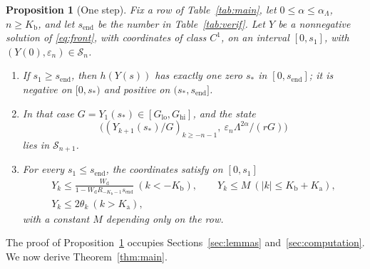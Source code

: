 \documentclass[12pt,reqno]{amsart}
\numberwithin{equation}{section}
\theoremstyle{plain}
\newtheorem{proposition}[theorem]{Proposition}
\theoremstyle{definition}
\theoremstyle{remark}
\newcommand{\Kb}{K_{\mathrm b}}
\newcommand{\Ka}{K_{\mathrm a}}
\newcommand{\Glo}{G_{\mathrm{lo}}}
\newcommand{\Ghi}{G_{\mathrm{hi}}}
\newcommand{\send}{s_{\mathrm{end}}}
\newcommand{\Wd}{W_{\mathrm d}}
\newcommand{\eps}{\varepsilon}
\begin{document}
\begin{proposition}[One step]\label{prop:step}
Fix a row of Table~\ref{tab:main}, let $0\le\alpha\le\alpha_\Lambda$, $n\ge\Kb$, and let
$\send$ be the number in Table~\ref{tab:verif}. Let $Y$ be a nonnegative
solution of \eqref{eq:front}, with coordinates of class $C^1$, on an
interval $[0,s_1]$, with $(Y(0),\eps_n)\in\mathcal S_n$.
\begin{enumerate}[label=\textup{(\roman*)}]
\item If $s_1\ge\send$, then $h(Y(s))$ has exactly one zero $s_*$ in
  $[0,\send]$; it is negative on $[0,s_*)$ and positive on $(s_*,\send]$.
\item In that case $G=Y_1(s_*)\in[\Glo,\Ghi]$, and the state
  \[
    \bigl((Y_{k+1}(s_*)/G)_{k\ge-n-1},\ \eps_n\Lambda^{2\alpha}/(rG)\bigr)
  \]
  lies in $\mathcal S_{n+1}$.
\item For every $s_1\le\send$, the coordinates satisfy on $[0,s_1]$
  \begin{gather*}
    Y_k\le\frac{\Wd}{1-\Wd R_{-\Kb-1}\send}\ (k<-\Kb),\qquad Y_k\le M\ (|k|\le\Kb+\Ka),\\
    Y_k\le2\theta_k\ (k>\Ka),
  \end{gather*}
  with a constant $M$ depending only on the row.
\end{enumerate}
\end{proposition}

The proof of Proposition~\ref{prop:step} occupies
Sections~\ref{sec:lemmas} and~\ref{sec:computation}. We now derive
Theorem~\ref{thm:main}.
\end{document}
